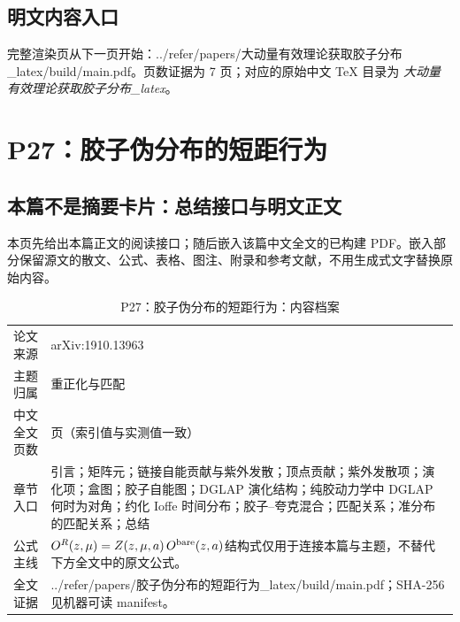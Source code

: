 \documentclass[UTF8,11pt,oneside]{ctexbook}
\begin{document}
\section*{明文内容入口}
\noindent 完整渲染页从下一页开始：../\allowbreak{}refer/\allowbreak{}papers/\allowbreak{}大动量有效理论获取胶子分布\_\allowbreak{}latex/\allowbreak{}build/\allowbreak{}main.pdf。页数证据为 7 页；对应的原始中文 TeX 目录为 \emph{大动量有效理论获取胶子分布\_latex}。
\clearpage

\clearpage

\chapter{P27：胶子伪分布的短距行为}
\section*{本篇不是摘要卡片：总结接口与明文正文}
本页先给出本篇正文的阅读接口；随后嵌入该篇中文全文的已构建 PDF。嵌入部分保留源文的散文、公式、表格、图注、附录和参考文献，不用生成式文字替换原始内容。
\begin{table}[htbp]
  \centering
  \caption{P27：胶子伪分布的短距行为：内容档案}
  \small
  \begin{tabularx}{0.96\textwidth}{@{}p{3.3cm}>{\raggedright\arraybackslash}X@{}}
    \toprule
    论文来源 & arXiv:1910.13963 \\
    主题归属 & 重正化与匹配 \\
    中文全文页数 & 14 页（索引值与实测值一致） \\
    章节入口 & 引言；矩阵元；链接自能贡献与紫外发散；顶点贡献；紫外发散项；演化项；盒图；胶子自能图；DGLAP 演化结构；纯胶动力学中 DGLAP 何时为对角；约化 Ioffe 时间分布；胶子–夸克混合；匹配关系；准分布的匹配关系；总结 \\
    公式主线 & $O^{R}(z,\mu)=Z(z,\mu,a)\,O^{\rm bare}(z,a)$\newline\scriptsize 结构式仅用于连接本篇与主题，不替代下方全文中的原文公式。 \\
    全文证据 & ../\allowbreak{}refer/\allowbreak{}papers/\allowbreak{}胶子伪分布的短距行为\_\allowbreak{}latex/\allowbreak{}build/\allowbreak{}main.pdf；SHA-256 见机器可读 manifest。 \\
    \bottomrule
  \end{tabularx}
\end{table}
\end{document}
